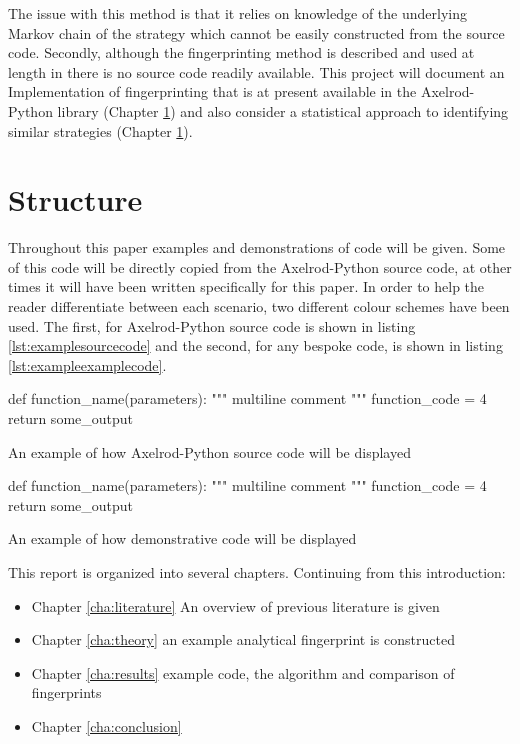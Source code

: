 The issue with this method is that it relies on knowledge of the underlying Markov chain of the strategy which cannot be easily constructed from the source code.
Secondly, although the fingerprinting method is described and used at length in
\cite{} there is no source code readily available. This project will document an
Implementation of fingerprinting that is at present available in the
Axelrod-Python library (Chapter \ref{}) and also consider a statistical approach to identifying
similar strategies (Chapter \ref{}).  %


\section{Structure}

Throughout this paper examples and demonstrations of code will be given.
Some of this code will be directly copied from the Axelrod-Python source code, at other times it will have been written specifically for this paper.
In order to help the reader differentiate between each scenario, two different colour schemes have been used.
The first, for Axelrod-Python source code is shown in listing \ref{lst:examplesourcecode} and the second, for any bespoke code, is shown in listing \ref{lst:exampleexamplecode}.

\begin{listing}[hbtp!]
\begin{SourceCode}
def function_name(parameters):
    """
    multiline comment
    """
    function_code = 4
    return some_output
\end{SourceCode}
\caption{An example of how Axelrod-Python source code will be displayed}
\label{lst:examplesourcecode}
\end{listing}

\begin{listing}[hbtp!]
\begin{ExampleCode}
def function_name(parameters):
    """
    multiline comment
    """
    function_code = 4
    return some_output
\end{ExampleCode}
\caption{An example of how demonstrative code will be displayed}
\label{lst:exampleexamplecode}
\end{listing}{}

This report is organized into several chapters. Continuing from this introduction:

\begin{itemize}
    \item Chapter \ref{cha:literature} An overview of previous literature is given
    \item Chapter \ref{cha:theory} an example analytical fingerprint is constructed
    \item Chapter \ref{cha:results} example code, the algorithm and comparison of fingerprints
    \item Chapter \ref{cha:conclusion}
\end{itemize}

